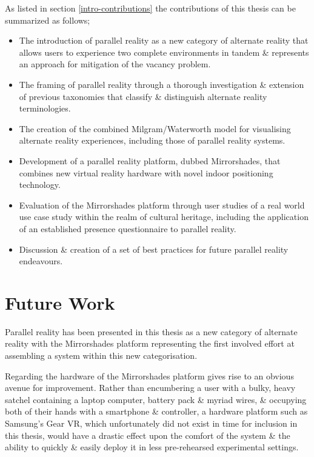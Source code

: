 As listed in section \ref{intro-contributions} the contributions of this thesis can be summarized as follows;

\begin{itemize}
	\item The introduction of parallel reality as a new category of alternate reality that allows users to experience two complete environments in tandem \& represents an approach for mitigation of the vacancy problem.
	\item The framing of parallel reality through a thorough investigation \& extension of previous taxonomies that classify \& distinguish alternate reality terminologies.
	\item The creation of the combined Milgram/Waterworth model for visualising alternate reality experiences, including those of parallel reality systems.
	\item Development of a parallel reality platform, dubbed Mirrorshades, that combines new virtual reality hardware with novel indoor positioning technology.
	\item Evaluation of the Mirrorshades platform through user studies of a real world use case study within the realm of cultural heritage, including the application of an established presence questionnaire to parallel reality.
	\item Discussion \& creation of a set of best practices for future parallel reality endeavours.
\end{itemize}


\section{Future Work}

Parallel reality has been presented in this thesis as a new category of alternate reality with the Mirrorshades platform representing the first involved effort at assembling a system within this new categorisation.

Regarding the hardware of the Mirrorshades platform gives rise to an obvious avenue for improvement. Rather than encumbering a user with a bulky, heavy satchel containing a laptop computer, battery pack \& myriad wires, \& occupying both of their hands with a smartphone \& controller, a hardware platform such as Samsung's Gear VR, which unfortunately did not exist in time for inclusion in this thesis, would have a drastic effect upon the comfort of the system \& the ability to quickly \& easily deploy it in less pre-rehearsed experimental settings.

